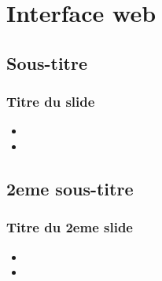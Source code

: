\section{Interface web}

	\subsection{Sous-titre}
		\begin{frame}
		    \frametitle{\textbf{Titre du slide}}
			\begin{itemize}
				 \item 
				 \item 
			\end{itemize}
		\end{frame}

\subsection{2eme sous-titre}
	\begin{frame}
		\frametitle{\textbf{Titre du 2eme slide}}
		\begin{itemize}
			\item 
			\item 
		\end{itemize}
	\end{frame}
